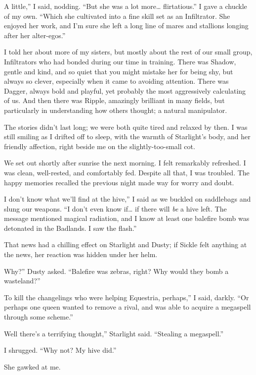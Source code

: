 \leavevmode{}A little,” I said, nodding. “But she was a lot more… flirtatious.” I gave a chuckle of my own. “Which she cultivated into a fine skill set as an Infiltrator. She enjoyed her work, and I’m sure she left a long line of mares and stallions longing after her alter-egos.”

I told her about more of my sisters, but mostly about the rest of our small group, Infiltrators who had bonded during our time in training. There was Shadow, gentle and kind, and so quiet that you might mistake her for being shy, but always so clever, especially when it came to avoiding attention. There was Dagger, always bold and playful, yet probably the most aggressively calculating of us. And then there was Ripple, amazingly brilliant in many fields, but particularly in understanding how others thought; a natural manipulator.

The stories didn’t last long; we were both quite tired and relaxed by then. I was still smiling as I drifted off to sleep, with the warmth of Starlight’s body, and her friendly affection, right beside me on the slightly-too-small cot.

{\br}%
We set out shortly after sunrise the next morning. I felt remarkably refreshed. I was clean, well-rested, and comfortably fed. Despite all that, I was troubled. The happy memories recalled the previous night made way for worry and doubt.

\leavevmode{}I don’t know what we’ll find at the hive,” I said as we buckled on saddlebags and slung our weapons. “I don’t even know if… if there will \textit{be} a hive left. The message mentioned magical radiation, and I know at least one balefire bomb was detonated in the Badlands. I saw the flash.”

That news had a chilling effect on Starlight and Dusty; if Sickle felt anything at the news, her reaction was hidden under her helm.

\leavevmode{}Why?” Dusty asked. “Balefire was zebras, right? Why would they bomb a wasteland?”

\leavevmode{}To kill the changelings who were helping Equestria, perhaps,” I said, darkly. “Or perhaps one queen wanted to remove a rival, and was able to acquire a megaspell through some scheme.”

\leavevmode{}Well there’s a terrifying thought,” Starlight said. “Stealing a megaspell.”

I shrugged. “Why not? My hive did.”

She gawked at me.

